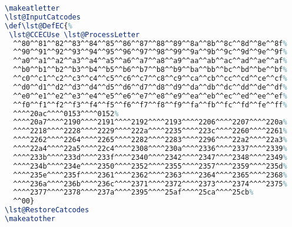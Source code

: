 \begin{tcolorbox}[breakable, size=fbox, boxrule=1pt, pad at break*=1mm,colback=cellbackground, colframe=cellborder]
\begin{lstlisting}[language=TeX,frame=single,framerule=0pt,label=lst:scr1837X0]
% set lstlisting to accept UTF-8 APL text
\makeatletter
\lst@InputCatcodes
\def\lst@DefEC{%
 \lst@CCECUse \lst@ProcessLetter
  ^^80^^81^^82^^83^^84^^85^^86^^87^^88^^89^^8a^^8b^^8c^^8d^^8e^^8f%
  ^^90^^91^^92^^93^^94^^95^^96^^97^^98^^99^^9a^^9b^^9c^^9d^^9e^^9f%
  ^^a0^^a1^^a2^^a3^^a4^^a5^^a6^^a7^^a8^^a9^^aa^^ab^^ac^^ad^^ae^^af%
  ^^b0^^b1^^b2^^b3^^b4^^b5^^b6^^b7^^b8^^b9^^ba^^bb^^bc^^bd^^be^^bf%
  ^^c0^^c1^^c2^^c3^^c4^^c5^^c6^^c7^^c8^^c9^^ca^^cb^^cc^^cd^^ce^^cf%
  ^^d0^^d1^^d2^^d3^^d4^^d5^^d6^^d7^^d8^^d9^^da^^db^^dc^^dd^^de^^df%
  ^^e0^^e1^^e2^^e3^^e4^^e5^^e6^^e7^^e8^^e9^^ea^^eb^^ec^^ed^^ee^^ef%
  ^^f0^^f1^^f2^^f3^^f4^^f5^^f6^^f7^^f8^^f9^^fa^^fb^^fc^^fd^^fe^^ff%
  ^^^^20ac^^^^0153^^^^0152%
  ^^^^20a7^^^^2190^^^^2191^^^^2192^^^^2193^^^^2206^^^^2207^^^^220a%
  ^^^^2218^^^^2228^^^^2229^^^^222a^^^^2235^^^^223c^^^^2260^^^^2261%
  ^^^^2262^^^^2264^^^^2265^^^^2282^^^^2283^^^^2296^^^^22a2^^^^22a3%
  ^^^^22a4^^^^22a5^^^^22c4^^^^2308^^^^230a^^^^2336^^^^2337^^^^2339%
  ^^^^233b^^^^233d^^^^233f^^^^2340^^^^2342^^^^2347^^^^2348^^^^2349%
  ^^^^234b^^^^234e^^^^2350^^^^2352^^^^2355^^^^2357^^^^2359^^^^235d%
  ^^^^235e^^^^235f^^^^2361^^^^2362^^^^2363^^^^2364^^^^2365^^^^2368%
  ^^^^236a^^^^236b^^^^236c^^^^2371^^^^2372^^^^2373^^^^2374^^^^2375%
  ^^^^2377^^^^2378^^^^237a^^^^2395^^^^25af^^^^25ca^^^^25cb%
  ^^00}
\lst@RestoreCatcodes
\makeatother
\end{lstlisting}
\end{tcolorbox}





